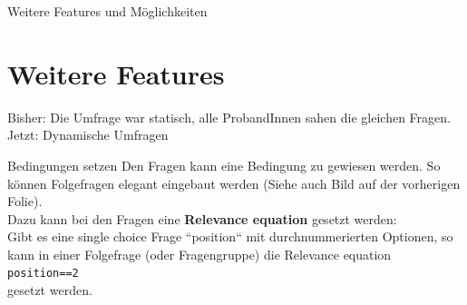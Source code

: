 \documentclass[aspectratio=1610, 9pt]{beamer}
\begin{document}
\begin{frame}{Weitere Features und Möglichkeiten}
	\section{Weitere Features}
	\label{sec:WeitereFeatures}
	Bisher: Die Umfrage war statisch, alle ProbandInnen sahen die gleichen
	Fragen.
	\\
	Jetzt: Dynamische Umfragen
	\begin{block}{Bedingungen setzen}
		Den Fragen kann eine Bedingung zu gewiesen werden. So können Folgefragen
		elegant eingebaut werden (Siehe auch Bild auf der vorherigen Folie).
		\\
		Dazu kann bei den Fragen eine \textbf{Relevance equation} gesetzt werden:
		\\
		Gibt es eine single choice Frage ``position`` mit durchnummerierten
		Optionen, so kann in einer Folgefrage (oder Fragengruppe) die Relevance
		equation
		\\
		\texttt{position==2}
		\\
		gesetzt werden.
	\end{block}
\end{frame}
\end{document}

